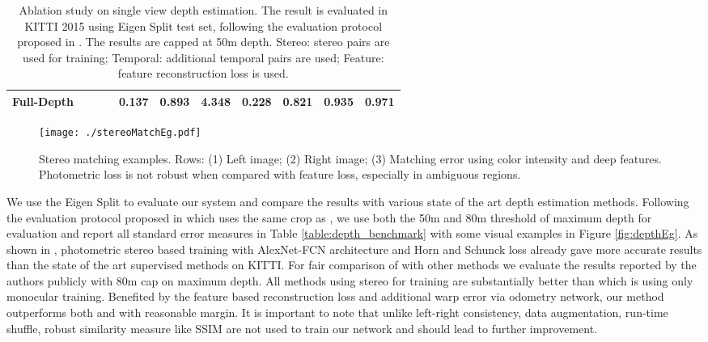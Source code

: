 \documentclass[10pt,twocolumn,letterpaper]{article}
\newcommand{\cmark}{\ding{51}}%
\begin{document}
\begin{table*}[t]
\begin{center}
{\begin{tabular}{| l || c c c || c c c c| c c c|}
% 
Full-Depth & 
\cmark & \cmark & \cmark &
0.137 & 0.893 & 4.348 & 0.228 &
0.821 & 0.935 & 0.971 \\


\hline

\end{tabular}
}
\end{center}
\caption{Ablation study on single view depth estimation. The result is evaluated in KITTI 2015 using Eigen Split test set, following the evaluation protocol proposed in \cite{godard2016depth}. The results are capped at 50m depth. Stereo: stereo pairs are used for training; Temporal: additional temporal pairs are used; Feature: feature reconstruction loss is used.
\vspace{-5mm}
}
\label{table:depth_ablation}
\end{table*}

\begin{figure} 
\centering
    \texttt{[image: ./stereoMatchEg.pdf]}
    \caption{Stereo matching examples. Rows: (1) Left image; (2) Right image; (3) Matching error using color intensity and deep features. Photometric loss is not robust when compared with feature loss, especially in ambiguous regions.}\label{fig:stereoMatchEg}
\end{figure}


We use the Eigen Split to evaluate our system and compare the results with various state of the art depth estimation methods. Following the evaluation protocol proposed in \cite{godard2016depth} which uses the same crop as \cite{garg2016depth}, 
we use both the 50m and 80m threshold of maximum depth for evaluation and report all standard error measures in Table \ref{table:depth_benchmark} with some visual examples in Figure \ref{fig:depthEg}.
As shown in \cite{garg2016depth}, photometric stereo based training with AlexNet-FCN architecture and Horn and Schunck \cite{horn1981determining} loss already gave more accurate results than the state of the art supervised methods \cite{eigen2014depth}\cite{liu2016depth} on KITTI. 
For fair comparison of \cite{garg2016depth} with other methods we evaluate the results reported by the authors publicly with 80m cap on maximum depth. 
All methods using stereo for training are substantially better than \cite{zhou2017sfmlearner} which is using only monocular training. 
Benefited by the feature based reconstruction loss and  additional warp error via odometry network, our method outperforms both \cite{garg2016depth} and \cite{godard2016depth} with reasonable margin. It is important to note that unlike \cite{godard2016depth} left-right consistency, data augmentation, run-time shuffle, robust similarity measure like SSIM\cite{wang2004image} are not used to train our network and should lead to further improvement.
\end{document}
